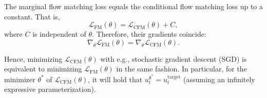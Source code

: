 \begin{theorem}
    The marginal flow matching loss equals the conditional flow matching loss up to a constant. That is,
    \begin{equation}
    \mathcal{L}_{\text{FM}}(\theta) = \mathcal{L}_{\text{CFM}}(\theta) + C,
    \end{equation}
    where $C$ is independent of $\theta$. Therefore, their gradients coincide:
    \begin{equation}
    \nabla_\theta \mathcal{L}_{\text{FM}}(\theta) = \nabla_\theta \mathcal{L}_{\text{CFM}}(\theta).
    \end{equation}

    
    Hence, minimizing $\mathcal{L}_{\text{CFM}}(\theta)$ with e.g., stochastic gradient descent (SGD) is equivalent to minimizing $\mathcal{L}_{\text{FM}}(\theta)$ in the same fashion. In particular, for the minimizer $\theta^*$ of $\mathcal{L}_{\text{CFM}}(\theta)$, it will hold that $u_t^{\theta^*} = u_t^{\text{target}}$ (assuming an infinitely expressive parameterization).
\end{theorem}
